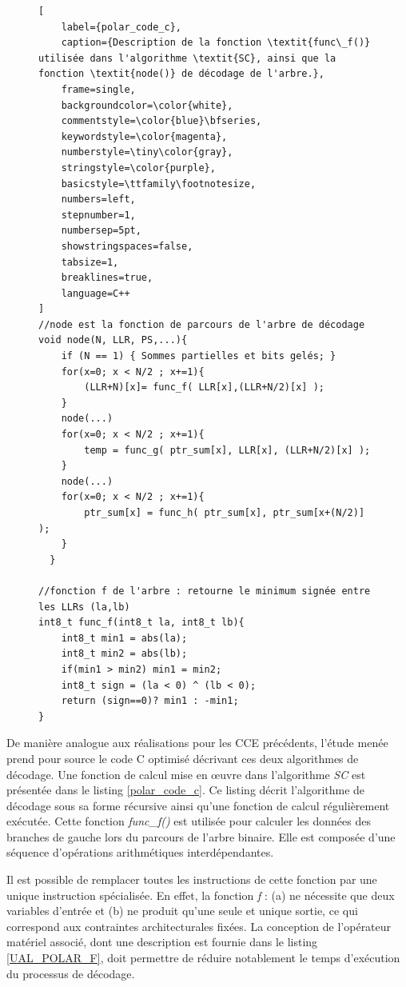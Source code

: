 \documentclass[../main.tex]{subfiles}
\begin{document}
\begin{figure}[tb]
\begin{lstlisting}[
    label={polar_code_c},
    caption={Description de la fonction \textit{func\_f()} utilisée dans l'algorithme \textit{SC}, ainsi que la fonction \textit{node()} de décodage de l'arbre.},
    frame=single,
    backgroundcolor=\color{white},  
    commentstyle=\color{blue}\bfseries,
    keywordstyle=\color{magenta},
    numberstyle=\tiny\color{gray},
    stringstyle=\color{purple},
    basicstyle=\ttfamily\footnotesize,
    numbers=left,
    stepnumber=1,
    numbersep=5pt,                 
    showstringspaces=false,
    tabsize=1,
    breaklines=true,
    language=C++
]
//node est la fonction de parcours de l'arbre de décodage 
void node(N, LLR, PS,...){
    if (N == 1) { Sommes partielles et bits gelés; }
    for(x=0; x < N/2 ; x+=1){
        (LLR+N)[x]= func_f( LLR[x],(LLR+N/2)[x] );
    }
    node(...)
    for(x=0; x < N/2 ; x+=1){
        temp = func_g( ptr_sum[x], LLR[x], (LLR+N/2)[x] );
    }
    node(...)
    for(x=0; x < N/2 ; x+=1){
        ptr_sum[x] = func_h( ptr_sum[x], ptr_sum[x+(N/2)] );
    }
  }

//fonction f de l'arbre : retourne le minimum signée entre les LLRs (la,lb)
int8_t func_f(int8_t la, int8_t lb){
    int8_t min1 = abs(la);
    int8_t min2 = abs(lb);
    if(min1 > min2) min1 = min2;
    int8_t sign = (la < 0) ^ (lb < 0);
    return (sign==0)? min1 : -min1;
}
\end{lstlisting}
\end{figure}
De manière analogue aux réalisations pour les CCE précédents, l'étude menée prend pour source le code C optimisé décrivant ces deux algorithmes de décodage. Une fonction de calcul mise en œuvre dans l'algorithme \textit{SC} est présentée dans le listing \ref{polar_code_c}. Ce listing décrit l'algorithme de décodage sous sa forme récursive ainsi qu'une fonction de calcul régulièrement exécutée. Cette fonction \textit{func\_f()} est utilisée pour calculer les données des branches de gauche lors du parcours de l'arbre binaire. Elle est composée d'une séquence d'opérations arithmétiques interdépendantes.

Il est possible de remplacer toutes les instructions de cette fonction par une unique instruction spécialisée. En effet, la fonction \textit{f} : (a) ne nécessite que deux variables d'entrée et (b) ne produit qu'une seule et unique sortie, ce qui correspond aux contraintes architecturales fixées. La conception de l'opérateur matériel associé, dont une description est fournie dans le listing \ref{UAL_POLAR_F}, doit permettre de réduire notablement le temps d'exécution du processus de décodage.
\end{document}
